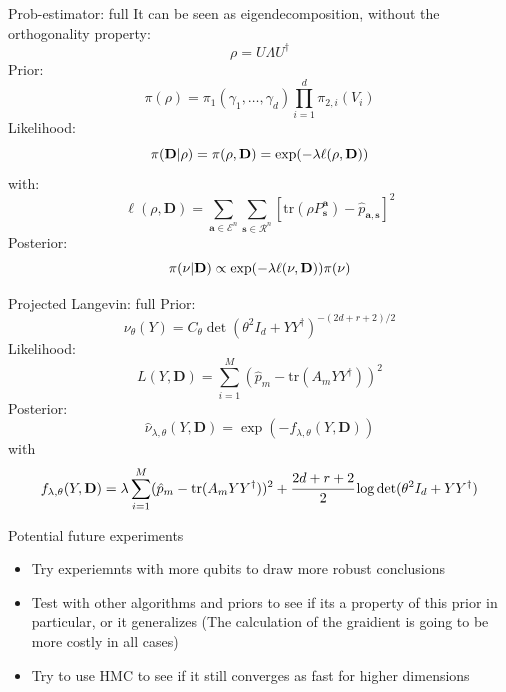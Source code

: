 \documentclass{beamer}
\newcommand{\tr}{\text{tr}}
\newcommand{\mb}{\mathbf}
\newcommand{\tb}{\textbf}
\begin{document}
\begin{frame}{Prob-estimator: full}
    It can be seen as eigendecomposition, without the orthogonality property:
    \begin{equation}
        \rho = U\Lambda U^\dagger
    \end{equation}
    Prior:
    \begin{equation}
        \pi(\rho) = \pi_1(\gamma_1, \dots, \gamma_d) \prod_{i=1}^d \pi_{2, i}(V_i)
    \end{equation}
    Likelihood:
    \begin{equation}
        \pi(\tb D| \rho) = \pi(\rho, \mb D) = \exp(-\lambda \ell(\rho,\mb D))
    \end{equation}
    with:
    \begin{equation}
        \ell(\rho, \mb D) = \sum_{\mb a \in \mathcal{E}^n} \sum_{\mb s \in \mathcal{R}^n} \left[\tr(\rho P^{\mb a}_{\mb s}) - \hat p_{\mb a,\mb s}\right]^2
    \end{equation}
    Posterior:
    \begin{equation}
        \pi(\nu|\tb D) \propto \exp(-\lambda\ell(\nu, \mb D)) \pi(\nu)
    \end{equation}
\end{frame}
\begin{frame}{Projected Langevin: full}
    Prior:
    \begin{equation}
        \nu_{\theta} (Y) = C_\theta \det(\theta^2I_d + YY^\dagger)^{-(2d+r+2)/2}
    \end{equation}
    Likelihood: 
    \begin{equation}
        L(Y, \mb D) = \sum^{M}_{i=1} (\hat p_m - \tr(A_mYY^\dagger))^2
    \end{equation}
    Posterior:
    \begin{equation}
        \hat \nu_{\lambda, \theta}(Y, \mb D) = \exp(-f_{\lambda, \theta}(Y, \mb D))
    \end{equation}
    with \begin{equation}
        f_{\lambda, \theta}(Y, \mb D) = \lambda \sum^{M}_{i=1} (\hat p_m - \tr(A_mYY^\dagger))^2 + \cfrac{2d + r + 2}{2}\log \det(\theta^2I_d + YY^\dagger)
    \end{equation} 

\end{frame}
\begin{frame}{Potential future experiments}
    \begin{itemize}
        \item Try experiemnts with more qubits to draw more robust conclusions
        \item Test with other algorithms and priors to see if its a property of this prior in particular, or it generalizes (The calculation of the graidient is going to be more costly in all cases)
        \item Try to use HMC to see if it still converges as fast for higher dimensions
    \end{itemize}
    
\end{frame}
\end{document}
